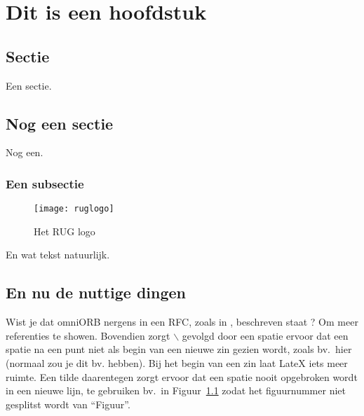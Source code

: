\chapter{Dit is een hoofdstuk}

\section{Sectie}

Een sectie.

\section{Nog een sectie}
\label{sec:nogeensectie}

Nog een.

\subsection{Een subsectie}

\begin{figure}[htb]
\begin{center}
 \texttt{[image: ruglogo]}
 \caption{Het RUG logo}
 \label{fig:ruglogo}
\end{center}
\end{figure}

En wat tekst natuurlijk.

\section{En nu de nuttige dingen}

Wist je dat omniORB\cite{six2013tarsos_jnmr} nergens in een RFC, zoals in \cite{six2013tarsos_jnmr}, beschreven staat ? Om meer referenties\cite{six2013tarsos_jnmr, six2015multimodal} te showen. Bovendien zorgt $\backslash$ gevolgd door een spatie ervoor dat een spatie na
een punt niet als begin van een nieuwe zin gezien wordt, zoals bv.\ hier (normaal zou je dit bv. hebben). Bij het begin van een zin laat LateX iets meer ruimte. Een tilde daarentegen
zorgt ervoor dat een spatie nooit opgebroken wordt in een nieuwe lijn, te gebruiken bv.\ in Figuur~\ref{fig:ruglogo} zodat het figuurnummer niet
gesplitst wordt van ``Figuur''.

